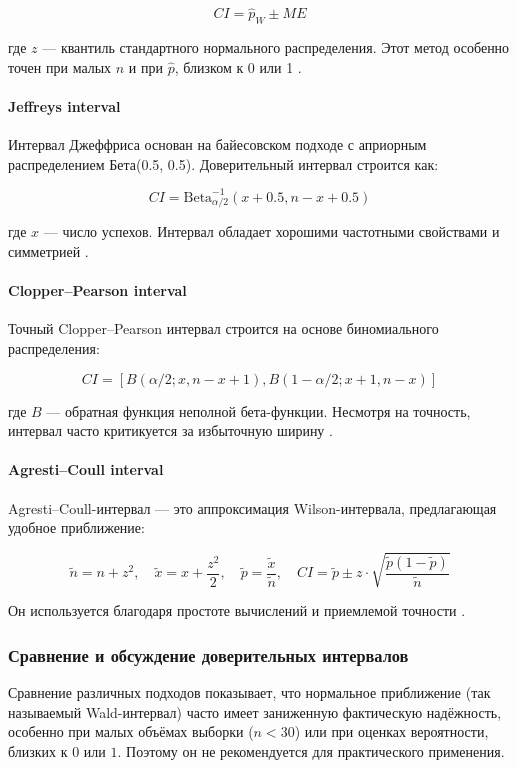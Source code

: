 \[
CI = \hat{p}_W \pm ME
\]

где $z$ — квантиль стандартного нормального распределения. Этот метод особенно точен при малых $n$ и при $\hat{p}$, близком к 0 или 1 \cite{brown2001interval}.

\paragraph{Jeffreys interval}

Интервал Джеффриса основан на байесовском подходе с априорным распределением Бета(0.5, 0.5). Доверительный интервал строится как:

\[
CI = \text{Beta}^{-1}_{\alpha/2}(x + 0.5, n - x + 0.5)
\]

где $x$ — число успехов. Интервал обладает хорошими частотными свойствами и симметрией \cite{brown2001interval}.

\paragraph{Clopper–Pearson interval}

Точный Clopper–Pearson интервал строится на основе биномиального распределения:

\[
CI = [B(\alpha/2; x, n - x + 1), B(1 - \alpha/2; x + 1, n - x)]
\]

где $B$ — обратная функция неполной бета-функции. Несмотря на точность, интервал часто критикуется за избыточную ширину \cite{clopper1934use}.

\paragraph{Agresti–Coull interval}

Agresti–Coull-интервал — это аппроксимация Wilson-интервала, предлагающая удобное приближение:

\[
\tilde{n} = n + z^2, \quad \tilde{x} = x + \frac{z^2}{2}, \quad \tilde{p} = \frac{\tilde{x}}{\tilde{n}}, \quad
CI = \tilde{p} \pm z \cdot \sqrt{\frac{\tilde{p}(1 - \tilde{p})}{\tilde{n}}}
\]

Он используется благодаря простоте вычислений и приемлемой точности \cite{agresti1998}.

\subsubsection{Сравнение и обсуждение доверительных интервалов}

Сравнение различных подходов показывает, что нормальное приближение (так называемый Wald-интервал) часто имеет заниженную фактическую надёжность, особенно при малых объёмах выборки ($n < 30$) или при оценках вероятности, близких к $0$ или $1$. Поэтому он не рекомендуется для практического применения.

